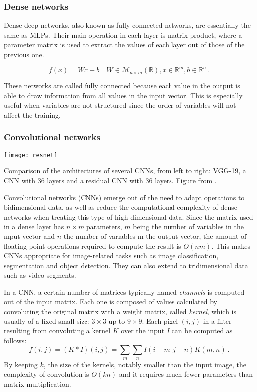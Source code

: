 \subsubsection{Dense networks}

Dense deep networks, also known as fully connected networks, are essentially the same as MLPs. Their main operation in each layer is matrix product, where a parameter matrix is used to extract the values of each layer out of those of the previous one. 

\begin{equation}
    f(x)=Wx + b\quad W\in \mathcal M_{n\times m}(\mathbb R), x\in\mathbb R^m, b\in\mathbb R^n~.
\end{equation}

These networks are called fully connected because each value in the output is able to draw information from all values in the input vector. This is especially useful when variables are not structured since the order of variables  will not affect the training.

\subsubsection{Convolutional networks}

\begin{marginfigure}
    \texttt{[image: resnet]}
    \caption{\label{fig:resnet}Comparison of the architectures of several CNNs, from left to right: VGG-19, a CNN with 36 layers and a residual CNN with 36 layers. Figure from \cite{he2016deep}.}
\end{marginfigure}


Convolutional networks (CNNs) emerge out of the need to adapt operations to bidimensional data, as well as reduce the computational complexity of dense networks when treating this type of high-dimensional data. Since the matrix used in a dense layer has $n\times m$ parameters, $m$ being the number of variables in the input vector and $n$ the number of variables in the output vector, the amount of floating point operations required to compute the result is $O\left(nm\right)$. This makes CNNs appropriate for image-related tasks such as image classification, segmentation and object detection. They can also extend to tridimensional data such as video segments.

In a CNN, a certain number of matrices typically named \textit{channels} is computed out of the input matrix. Each one is composed of values calculated by convoluting the original matrix with a weight matrix, called \textit{kernel}, which is usually of a fixed small size: $3\times 3$ up to $9\times 9$. Each pixel $(i, j)$ in a filter resulting from convoluting a kernel $K$ over the input $I$ can be computed as follows:
\begin{equation}
    f(i,j)=\left(K\ast I\right)(i,j)=\sum_{m}\sum_{n}I(i-m,j-n)K(m,n)~.
\end{equation}
By keeping $k$, the size of the kernels, notably smaller than the input image, the complexity of convolution is $O(kn)$ and it requires much fewer parameters than matrix multiplication.

